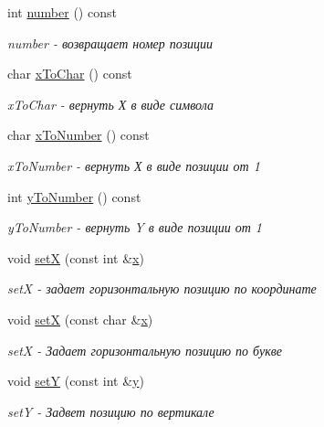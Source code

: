 \begin{DoxyCompactItemize}
int \hyperlink{classboard_position_afb83b12885a2ec552cecb067573011d4}{number} () const 
\begin{DoxyCompactList}\small\item\em number -\/ возвращает номер позиции \end{DoxyCompactList}\item 
char \hyperlink{classboard_position_a2f2f70653d4ef7e098b974e33c4fdcc2}{x\+To\+Char} () const 
\begin{DoxyCompactList}\small\item\em x\+To\+Char -\/ вернуть Х в виде символа \end{DoxyCompactList}\item 
char \hyperlink{classboard_position_a1128782cfef05468807b3a4449226894}{x\+To\+Number} () const 
\begin{DoxyCompactList}\small\item\em x\+To\+Number -\/ вернуть Х в виде позиции от 1 \end{DoxyCompactList}\item 
int \hyperlink{classboard_position_afce067f97792757bd643a58762e3d362}{y\+To\+Number} () const 
\begin{DoxyCompactList}\small\item\em y\+To\+Number -\/ вернуть Y в виде позиции от 1 \end{DoxyCompactList}\item 
void \hyperlink{classboard_position_a1715f2dcd0e8f94dd71998c5c4fd971a}{set\+X} (const int \&\hyperlink{classboard_position_abf254ede46c202864a513b548bf980c3}{x})
\begin{DoxyCompactList}\small\item\em set\+X -\/ задает горизонтальную позицию по координате \end{DoxyCompactList}\item 
void \hyperlink{classboard_position_af6ecff0221a8d5952e7fb6fe69f756a2}{set\+X} (const char \&\hyperlink{classboard_position_abf254ede46c202864a513b548bf980c3}{x})
\begin{DoxyCompactList}\small\item\em set\+X -\/ Задает горизонтальную позицию по букве \end{DoxyCompactList}\item 
void \hyperlink{classboard_position_ac587538a440a0db117090492d6ee9a48}{set\+Y} (const int \&\hyperlink{classboard_position_a189ee18b8ce9691afc7cc4090e929837}{y})
\begin{DoxyCompactList}\small\item\em set\+Y -\/ Задвет позицию по вертикале \end{DoxyCompactList}\item 

\end{DoxyCompactItemize}
